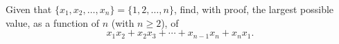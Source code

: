Given that $\{x_1, x_2, \ldots, x_n\} = \{1, 2, \ldots, n\}$, find,
with proof, the largest possible value, as a function of $n$ (with $n
\geq 2$), of
\[
x_1x_2 + x_2x_3 + \cdots + x_{n-1}x_n + x_nx_1.
\]
